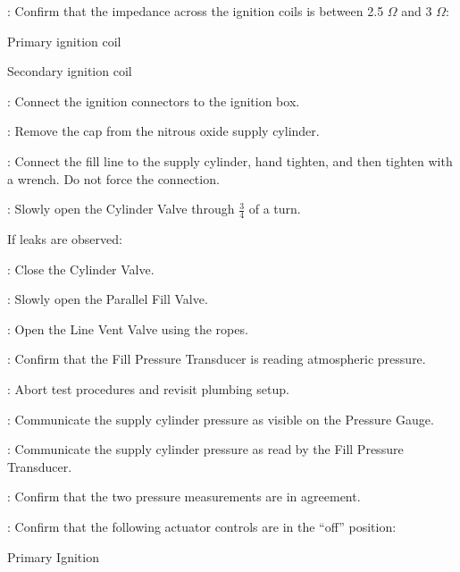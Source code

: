 \begin{checklist}
\begin {checklist}
    \end {checklist}
    \item \secondary: Confirm that the impedance across the ignition coils is between 2.5 $\Omega$ and 3 $\Omega$:
    \begin{checklist}
            \item Primary ignition coil
            \item Secondary ignition coil
    \end{checklist}
    \item \secondary: Connect the ignition connectors to the ignition box.
    \item \primary{}: Remove the cap from the nitrous oxide supply cylinder.
    \item \primary{}: Connect the fill line to the supply cylinder, hand tighten, and then tighten with a wrench. Do not force the connection.
    \item \primary: Slowly open the Cylinder Valve through $\frac{3}{4}$ of a turn.
    \begin{checklist}[label=$\bullet$]
        \item If leaks are observed:
        \begin{checklist}
            \item \primary{}: Close the Cylinder Valve.
            \item \primary{}: Slowly open the Parallel Fill Valve.
            \item \primary: Open the Line Vent Valve using the ropes.
            \item \daq{}: Confirm that the Fill Pressure Transducer is reading atmospheric pressure.
            \item \ops{}: Abort test procedures and revisit plumbing setup.
        \end{checklist}
    \end{checklist}
    \item \primary{}: Communicate the supply cylinder pressure as visible on the Pressure Gauge.
    \item \daq{}: Communicate the supply cylinder pressure as read by the Fill Pressure Transducer.
    \item \daq{}: Confirm that the two pressure measurements are in agreement.
    \item \secondary: Confirm that the following actuator controls are in the ``off'' position:
    \begin{checklist}
        \item Primary Ignition

\end{checklist}
\end{checklist}
